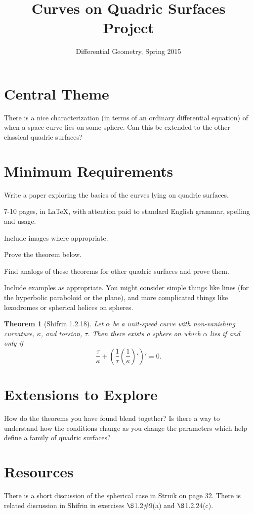 \documentclass[12pt]{amsart}
\theoremstyle{plain}
\newtheorem*{theorem}{Theorem}
\begin{document}
\title{Curves on Quadric Surfaces Project}
\author{Differential Geometry, Spring 2015}

\maketitle

\section*{Central Theme}

There is a nice characterization (in terms of an ordinary differential equation) of when a space curve lies on some sphere. Can this be extended to the other classical quadric surfaces?

\section*{Minimum Requirements}

Write a paper exploring the basics of the curves lying on quadric surfaces. 
\begin{compactitem}
\item 7-10 pages, in \LaTeX, with attention paid to standard English grammar, spelling and usage.
\item Include images where appropriate.
\item Prove the theorem below.
\item Find analogs of these theorems for other quadric surfaces and prove them.
\item Include examples as appropriate. You might consider simple things like lines (for the hyperbolic paraboloid or the plane), and more complicated things like loxodromes or spherical helices on spheres.
\end{compactitem}

\begin{theorem} [Shifrin 1.2.18]
Let $\alpha$ be a unit-speed curve with non-vanishing curvature, $\kappa$, and torsion, $\tau$. Then there exists a sphere on which $\alpha$ lies if and only if
\[
\dfrac{\tau}{\kappa} + \left( \dfrac{1}{\tau} \left( \dfrac{1}{\kappa}\right)'\right)' = 0.
\]
\end{theorem}

\section*{Extensions to Explore}

How do the theorems you have found blend together? Is there a way to understand how the conditions change as you change the parameters which help define a family of quadric surfaces?

\section*{Resources}

There is a short discussion of the spherical case in Struik on page 32. There is related discussion in Shifrin in exercises $\S$1.2\#9(a) and $\S$1.2.24(c).
\end{document}
